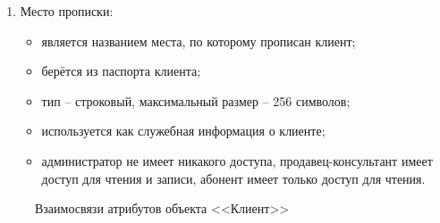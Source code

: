 \begin{enumerate}
\begin{enumerate}
        \item Место прописки:
        \begin{itemize}
            \item является названием места, по которому прописан клиент;
            \item берётся из паспорта клиента;
            \item тип -- строковый, максимальный размер -- 256 символов;
            \item используется как служебная информация о клиенте;
            \item администратор не имеет никакого доступа, продавец-консультант имеет доступ для чтения и записи, абонент имеет только доступ для чтения.
        \end{itemize}
    \end{enumerate}
    \begin{figure}[H]
        \label{fig:client-attributes}
        \caption{Взаимосвязи атрибутов объекта <<Клиент>>}
    \end{figure}


\end{enumerate}
